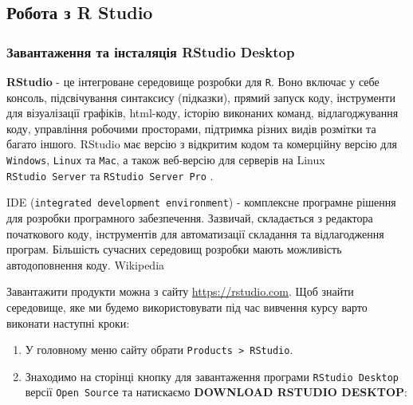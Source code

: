 \documentclass[
]{book}
\providecommand{\tightlist}{%
  \setlength{\itemsep}{0pt}\setlength{\parskip}{0pt}}
\begin{document}
\hypertarget{chapter132}{%
\subsection{Робота з R Studio}\label{chapter132}}

\hypertarget{chapter1321}{%
\subsubsection{Завантаження та інсталяція RStudio Desktop}\label{chapter1321}}

\textbf{RStudio} - це інтегроване середовище розробки для \texttt{R}. Воно включає у себе консоль, підсвічування синтаксису (підказки), прямий запуск коду, інструменти для візуалізації графіків, html-коду, історію виконаних команд, відлагоджування коду, управління робочими просторами, підтримка різних видів розмітки та багато іншого. RStudio має версію з відкритим кодом та комерційну версію для \texttt{Windows}, \texttt{Linux} та \texttt{Mac}, а також веб-версію для серверів на Linux \texttt{RStudio\ Server} та \texttt{RStudio\ Server\ Pro} \citep{R-studio-site}.

IDE (\texttt{integrated\ development\ environment}) - комплексне програмне рішення для розробки програмного забезпечення. Зазвичай, складається з редактора початкового коду, інструментів для автоматизації складання та відлагодження програм. Більшість сучасних середовищ розробки мають можливість автодоповнення коду. Wikipedia

Завантажити продукти можна з сайту \url{https://rstudio.com}. Щоб знайти середовище, яке ми будемо використовувати під час вивчення курсу варто виконати наступні кроки:

\begin{enumerate}
\def\labelenumi{\arabic{enumi}.}
\tightlist
\item
  У головному меню сайту обрати \texttt{Products\ \textgreater{}\ RStudio}.
\item
  Знаходимо на сторінці кнопку для завантаження програми \texttt{RStudio\ Desktop} версії \texttt{Open\ Source} та натискаємо \textbf{DOWNLOAD RSTUDIO DESKTOP}:
\end{enumerate}
\end{document}
